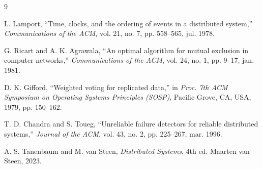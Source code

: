 \documentclass[conference,10pt]{IEEEtran}
\begin{document}
\begin{thebibliography}{9}

L. Lamport, ``Time, clocks, and the ordering of events in a distributed system,'' \textit{Communications of the ACM}, vol. 21, no. 7, pp. 558--565, jul. 1978.

G. Ricart and A. K. Agrawala, ``An optimal algorithm for mutual exclusion in computer networks,'' \textit{Communications of the ACM}, vol. 24, no. 1, pp. 9--17, jan. 1981.

D. K. Gifford, ``Weighted voting for replicated data,'' in \textit{Proc. 7th ACM Symposium on Operating Systems Principles (SOSP)}, Pacific Grove, CA, USA, 1979, pp. 150--162.

T. D. Chandra and S. Toueg, ``Unreliable failure detectors for reliable distributed systems,'' \textit{Journal of the ACM}, vol. 43, no. 2, pp. 225--267, mar. 1996.

A. S. Tanenbaum and M. van Steen, \textit{Distributed Systems}, 4th ed. Maarten van Steen, 2023.

\end{thebibliography}
\end{document}
